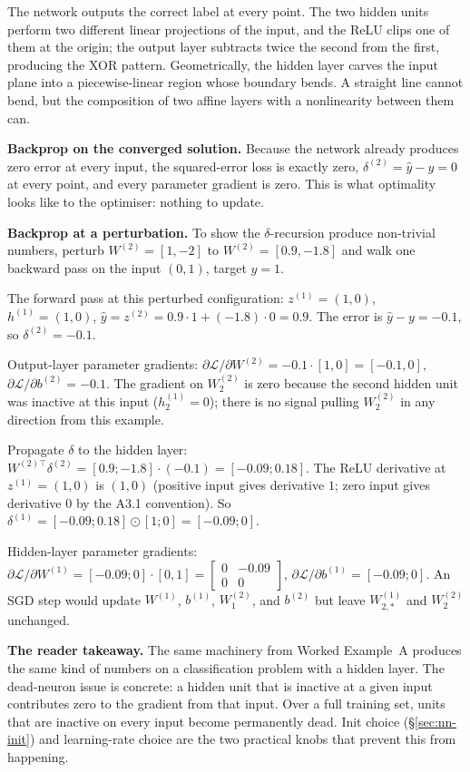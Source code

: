 \begin{workedexample}
The network outputs the correct label at every point. The two
hidden units perform two different linear projections of the
input, and the ReLU clips one of them at the origin; the output
layer subtracts twice the second from the first, producing the
XOR pattern. Geometrically, the hidden layer carves the input
plane into a piecewise-linear region whose boundary bends. A
straight line cannot bend, but the composition of two affine
layers with a nonlinearity between them can.

\textbf{Backprop on the converged solution.} Because the network
already produces zero error at every input, the squared-error
loss is exactly zero, $\delta^{(2)} = \hat y - y = 0$ at every
point, and every parameter gradient is zero. This is what
optimality looks like to the optimiser: nothing to update.

\textbf{Backprop at a perturbation.} To show the
$\delta$-recursion produce non-trivial numbers, perturb
$W^{(2)} = [1, -2]$ to $W^{(2)} = [0.9, -1.8]$ and walk one
backward pass on the input $(0, 1)$, target $y = 1$.

The forward pass at this perturbed configuration:
$z^{(1)} = (1, 0)$, $h^{(1)} = (1, 0)$,
$\hat y = z^{(2)} = 0.9 \cdot 1 + (-1.8) \cdot 0 = 0.9$.
The error is $\hat y - y = -0.1$, so $\delta^{(2)} = -0.1$.

Output-layer parameter gradients:
$\partial \mathcal{L} / \partial W^{(2)}
= -0.1 \cdot [1, 0] = [-0.1, 0]$,
$\partial \mathcal{L} / \partial b^{(2)} = -0.1$. The gradient on
$W^{(2)}_2$ is zero because the second hidden unit was inactive
at this input ($h^{(1)}_2 = 0$); there is no signal pulling
$W^{(2)}_2$ in any direction from this example.

Propagate $\delta$ to the hidden layer:
$W^{(2)\top} \delta^{(2)} = [0.9; -1.8] \cdot (-0.1) = [-0.09; 0.18]$.
The ReLU derivative at $z^{(1)} = (1, 0)$ is $(1, 0)$ (positive
input gives derivative $1$; zero input gives derivative $0$ by
the A3.1 convention). So
$\delta^{(1)} = [-0.09; 0.18] \odot [1; 0] = [-0.09; 0]$.

Hidden-layer parameter gradients:
$\partial \mathcal{L} / \partial W^{(1)}
= [-0.09; 0] \cdot [0, 1] = \begin{bmatrix} 0 & -0.09 \\ 0 & 0 \end{bmatrix}$,
$\partial \mathcal{L} / \partial b^{(1)} = [-0.09; 0]$.
An SGD step would update $W^{(1)}$, $b^{(1)}$, $W^{(2)}_1$, and
$b^{(2)}$ but leave $W^{(1)}_{2,*}$ and $W^{(2)}_2$ unchanged.

\textbf{The reader takeaway.} The same machinery from Worked
Example~A produces the same kind of numbers on a classification
problem with a hidden layer. The dead-neuron issue is concrete:
a hidden unit that is inactive at a given input contributes zero
to the gradient from that input. Over a full training set, units
that are inactive on every input become permanently dead. Init
choice (\S\ref{sec:nn-init}) and learning-rate choice are the
two practical knobs that prevent this from happening.
\end{workedexample}

